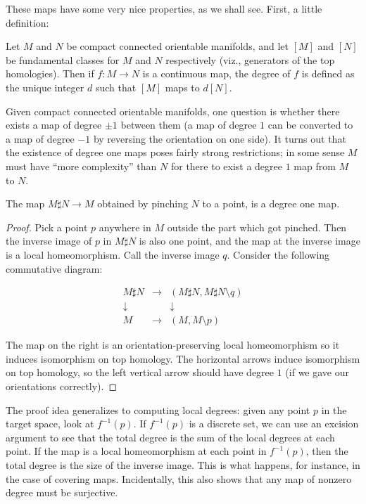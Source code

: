 \documentclass[a4paper]{amsart}
\begin{document}
These maps have some very nice properties, as we shall see. First, a
little definition:

\begin{definer}
  Let $M$ and $N$ be compact connected orientable manifolds, and let
  $[M]$ and $[N]$ be fundamental classes for $M$ and $N$ respectively
  (viz., generators of the top homologies). Then if $f:M \to N$ is a
  continuous map, the degree of $f$ is defined as the unique integer
  $d$ such that $[M]$ maps to $d[N]$.
\end{definer}

Given compact connected orientable manifolds, one question is whether
there exists a map of degree $\pm 1$ between them (a map of degree $1$
can be converted to a map of degree $-1$ by reversing the orientation
on one side). It turns out that the existence of degree one maps poses
fairly strong restrictions; in some sense $M$ must have ``more
complexity'' than $N$ for there to exist a degree $1$ map from $M$ to
$N$.

\begin{theorem}
  The map $M \sharp N \to M$ obtained by pinching $N$ to a point, is a
  degree one map.
\end{theorem}

\begin{proof}
  Pick a point $p$ anywhere in $M$ outside the part which got pinched.
  Then the inverse image of $p$ in $M \sharp N$ is also one point, and
  the map at the inverse image is a local homeomorphism.  Call the
  inverse image $q$. Consider the following commutative diagram:

  \begin{eqnarray*}
    M \sharp N & \rightarrow & (M \sharp N, M \sharp N \setminus q)\\
    \downarrow & & \downarrow \\
    M & \rightarrow & (M, M \setminus p)
  \end{eqnarray*}

  The map on the right is an orientation-preserving local
  homeomorphism so it induces isomorphism on top homology. The
  horizontal arrows induce isomorphism on top homology, so the left
  vertical arrow should have degree $1$ (if we gave our orientations
  correctly).
\end{proof}

The proof idea generalizes to computing local degrees: given any point
$p$ in the target space, look at $f^{-1}(p)$. If $f^{-1}(p)$ is a
discrete set, we can use an excision argument to see that the total
degree is the sum of the local degrees at each point. If the map is a
local homeomorphism at each point in $f^{-1}(p)$, then the total
degree is the size of the inverse image. This is what happens, for
instance, in the case of covering maps. Incidentally, this also shows
that any map of nonzero degree must be surjective.
\end{document}
